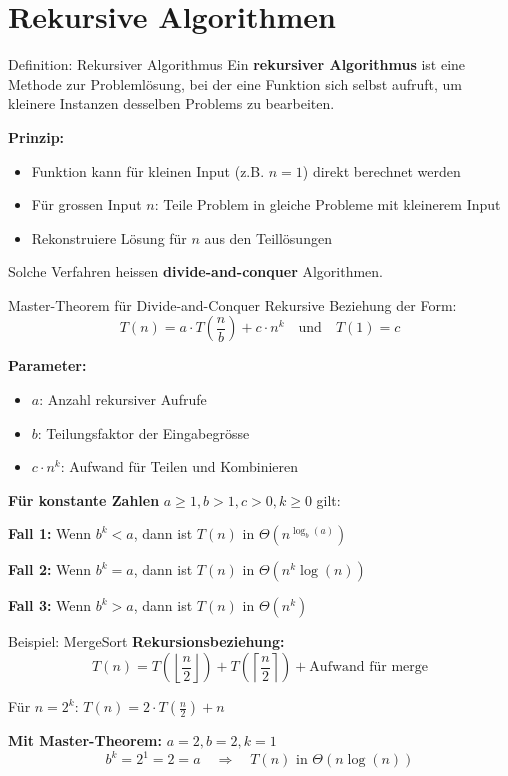 \documentclass[a4paper, fontsize=7pt]{scrartcl}
\begin{document}
\section{Rekursive Algorithmen}

\begin{mainbox}{Definition: Rekursiver Algorithmus}
Ein \textbf{rekursiver Algorithmus} ist eine Methode zur Problemlösung, bei der eine Funktion sich selbst aufruft, um kleinere Instanzen desselben Problems zu bearbeiten.

\textbf{Prinzip:}
\begin{itemize}
    \item Funktion kann für kleinen Input (z.B. $n=1$) direkt berechnet werden
    \item Für grossen Input $n$: Teile Problem in gleiche Probleme mit kleinerem Input
    \item Rekonstruiere Lösung für $n$ aus den Teillösungen
\end{itemize}

Solche Verfahren heissen \textbf{divide-and-conquer} Algorithmen.
\end{mainbox}

\begin{mainbox}{Master-Theorem für Divide-and-Conquer}
Rekursive Beziehung der Form:
$$T(n) = a \cdot T\left(\frac{n}{b}\right) + c \cdot n^k \quad \text{und} \quad T(1) = c$$

\textbf{Parameter:}
\begin{itemize}
    \item $a$: Anzahl rekursiver Aufrufe
    \item $b$: Teilungsfaktor der Eingabegrösse
    \item $c \cdot n^k$: Aufwand für Teilen und Kombinieren
\end{itemize}

\textbf{Für konstante Zahlen} $a \geq 1, b > 1, c > 0, k \geq 0$ gilt:

\textbf{Fall 1:} Wenn $b^k < a$, dann ist $T(n)$ in $\Theta(n^{\log_b(a)})$

\textbf{Fall 2:} Wenn $b^k = a$, dann ist $T(n)$ in $\Theta(n^k \log(n))$

\textbf{Fall 3:} Wenn $b^k > a$, dann ist $T(n)$ in $\Theta(n^k)$
\end{mainbox}

\begin{subbox}{Beispiel: MergeSort}
\textbf{Rekursionsbeziehung:}
$$T(n) = T\left(\left\lfloor\frac{n}{2}\right\rfloor\right) + T\left(\left\lceil\frac{n}{2}\right\rceil\right) + \text{Aufwand für merge}$$

Für $n = 2^k$: $T(n) = 2 \cdot T\left(\frac{n}{2}\right) + n$

\textbf{Mit Master-Theorem:} $a=2, b=2, k=1$
$$b^k = 2^1 = 2 = a \quad \Rightarrow \quad T(n) \text{ in } \Theta(n \log(n))$$
\end{subbox}
\end{document}

